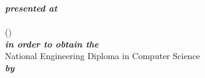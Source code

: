 \begin{titlepage}
\begin{center}
\vspace{30pt}%
\textbf{\textit{presented at}}\\

\vspace{10pt}
\ENIS{}\\
(\studyDepartment)\\

\vspace{30pt}
\textbf{\textit{in order to obtain the}}\\

\vspace{10pt}
National Engineering Diploma in Computer Science\\

\vspace{30pt}
\textbf{\textit{by}}\\
\vspace{10pt} {%
  \fontsize{18pt}{18pt}\selectfont%
  \textbf{\reportAuthor}\\
}%

\vspace{10pt} {%
  \renewcommand*{\familydefault}{\defaultFont}
  \fontsize{27pt}{27pt}\selectfont%
  \HRule%
  \vspace{10pt}
  \reportSubject{}\\%
  \vspace{10pt}
  \HRule%
}


\vfill

\end{center}
\end{titlepage}